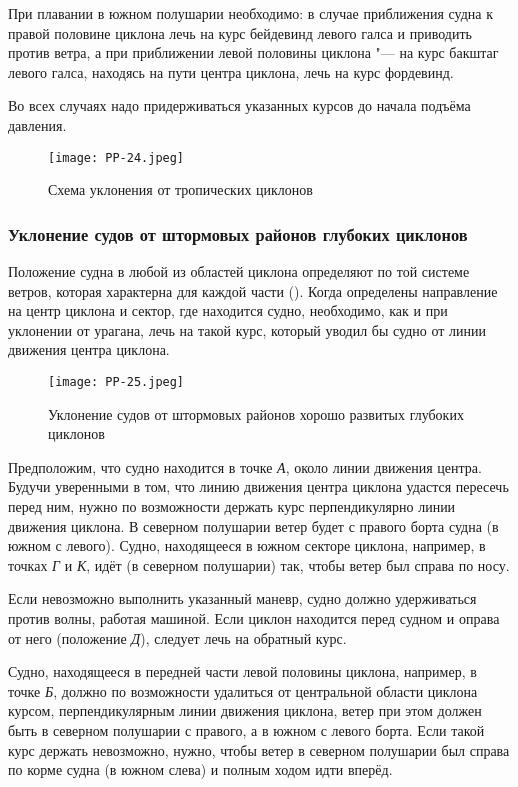 При плавании в южном полушарии необходимо: в случае приближения судна
к правой половине циклона лечь на курс бейдевинд левого галса и
приводить против ветра, а при приближении левой половины циклона "---
на курс бакштаг левого галса, находясь на пути центра циклона, лечь на
курс фордевинд.

Во всех случаях надо придерживаться указанных курсов до начала подъёма
давления.

\begin{figure}[htb]
  \centering{}
  \texttt{[image: PP-24.jpeg]}
  \caption{Схема уклонения от тропических циклонов}
  \label{fig:pp24}
  \small
  \centering{}
\end{figure}

\subsubsection{Уклонение судов от штормовых районов глубоких циклонов}

Положение судна в любой из областей циклона определяют по той системе
ветров, которая характерна для каждой части (). Когда
определены направление на центр циклона и сектор, где находится судно,
необходимо, как и при уклонении от урагана, лечь на такой курс,
который уводил бы судно от линии движения центра циклона.

\begin{figure}[htb]
  \centering{}
  \texttt{[image: PP-25.jpeg]}
  \caption{Уклонение судов от штормовых районов хорошо развитых глубоких циклонов}
  \label{fig:pp25}
  \small
  \centering{}
\end{figure}

Предположим, что судно находится в точке \textit{А}, около линии
движения центра. Будучи уверенными в том, что линию движения центра
циклона удастся пересечь перед ним, нужно по возможности держать курс
перпендикулярно линии движения циклона. В северном полушарии ветер
будет с правого борта судна (в южном с левого). Судно, находящееся в
южном секторе циклона, например, в точках \textit{Г} и \textit{К},
идёт (в северном полушарии) так, чтобы ветер был справа по носу.

Если невозможно выполнить указанный маневр, судно должно удерживаться
против волны, работая машиной. Если циклон находится перед судном и
оправа от него (положение \textit{Д}), следует лечь на обратный курс.

Судно, находящееся в передней части левой половины циклона, например,
в точке \textit{Б}, должно по возможности удалиться от центральной области
циклона курсом, перпендикулярным линии движения циклона, ветер при
этом должен быть в северном полушарии с правого, а в южном с левого
борта. Если такой курс держать невозможно, нужно, чтобы ветер в
северном полушарии был справа по корме судна (в южном слева) и полным
ходом идти вперёд.

